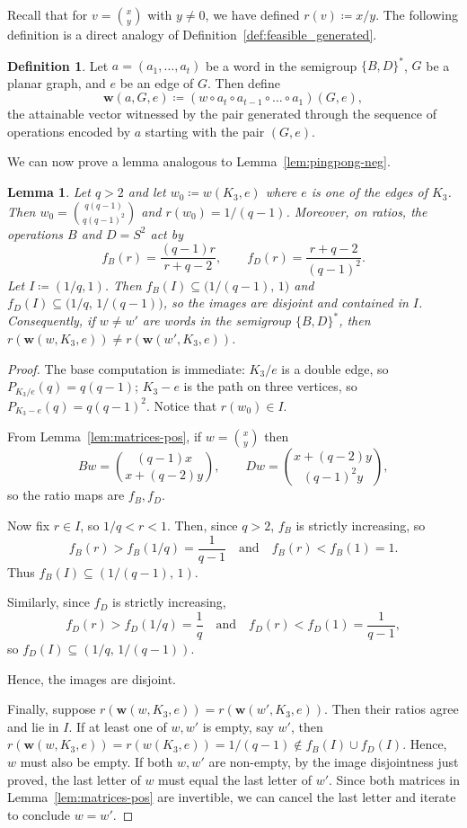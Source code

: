 \documentclass[A4paper,reqno,oneside,12pt]{amsart}
\theoremstyle{plain}
\newtheorem{lemma}[theorem]{Lemma}
\theoremstyle{definition}
\newtheorem{definition}[theorem]{Definition}
\begin{document}
Recall that for $v=\binom{x}{y}$ with $y \neq 0$, we have defined $r(v)\coloneqq x/y$. The following definition is a direct analogy of Definition~\ref{def:feasible_generated}.

\begin{definition}
 Let $a = (a_1,\dots,a_t)$ be a word in the semigroup $\{B,D\}^\ast $, $G$ be a planar graph, and $e$ be an edge of $G$. Then define 
      \[\mathbf{w}(a,G,e) \coloneqq (w\circ a_t\circ a_{t-1}\circ\dots\circ a_1)(G,e),\]
     the attainable vector witnessed by the pair generated through the sequence of operations encoded by $a$ starting with the pair $(G,e)$.
\end{definition}
We can now prove a lemma analogous to Lemma~\ref{lem:pingpong-neg}.
\begin{lemma}\label{lem:pingpong-pos}
Let $q>2$ and let $w_0\coloneqq w(K_3,e)$ where $e$ is one of the edges of $K_3$.
Then $w_0=\binom{q(q-1)}{q(q-1)^2}$ and $r(w_0)=1/(q-1)$.
Moreover, on ratios, the operations $B$ and $D =S^2$ act by
\[
f_B(r)=\frac{(q-1)r}{r+q-2},\qquad f_D(r)=\frac{r+q-2}{(q-1)^2}.
\]
Let $I\coloneqq (1/q,1)$. Then $f_B(I)\subseteq \bigl(1/(q-1),\,1)$ and $f_D(I)\subseteq \bigl(1/q,\,1/(q-1)\bigr)$,
so the images are disjoint and contained in $I$.
Consequently, if $w\neq w'$ are words in the semigroup $\{B,D\}^\ast$, then $r(\mathbf{w}(w,K_3,e))\neq r(\mathbf{w}(w',K_3,e))$.
\end{lemma}

\begin{proof}
The base computation is immediate: $K_3/e$ is a double edge, so $P_{K_3/e}(q)=q(q-1)$; $K_3-e$ is the path on three vertices, so $P_{K_3-e}(q)=q(q-1)^2$. Notice that $r(w_0)\in I$.

From Lemma~\ref{lem:matrices-pos}, if $w=\binom{x}{y}$ then
\[
Bw=\binom{(q-1)x}{x+ (q-2)y},\qquad Dw=\binom{x +(q-2)y}{(q-1)^2y},
\]
so the ratio maps are $f_B,f_D$.

Now fix $r\in I$, so $1/q<r < 1$.
Then, since $q>2$, $f_B$ is strictly increasing, so
\[f_B(r) > f_B(1/q) = \frac{1}{q-1}\quad\text{and}\quad
f_B(r)< f_B(1) = 1.
\]
Thus $f_B(I)\subseteq (1/(q-1),\,1)$.

Similarly, since $f_D$ is strictly increasing,
\[f_D(r) > f_D(1/q) = \frac{1}{q}\quad\text{and}\quad
f_D(r) < f_D(1)=\frac{1}{q-1},
\]
so $f_D(I)\subseteq (1/q,\,1/(q-1))$. 

Hence, the images are disjoint.

Finally, suppose $r(\mathbf{w}(w,K_3,e))= r(\mathbf{w}(w',K_3,e))$. 
Then their ratios agree and lie in $I$. If at least one of $w,w'$ is empty, say $w'$, then $r(\mathbf{w}(w,K_3,e)) = r(w(K_3,e))=1/(q-1) \not \in f_B(I) \cup f_D(I)$. Hence, $w$ must also be empty. 
If both $w,w'$ are non-empty, by the image disjointness just proved, the last letter of $w$ must equal the last letter of $w'$.
Since both matrices in Lemma~\ref{lem:matrices-pos} are invertible, we can cancel the last letter and iterate to conclude $w=w'$.
\end{proof}
\end{document}
